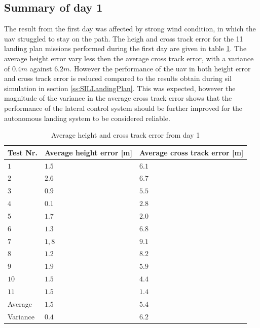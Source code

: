 \subsection{Summary of day 1}\label{sss:summaryDay1}
The result from the first day was affected by strong wind condition, in which the \gls{uav} struggled to stay on the path. The heigh and cross track error for the 11 landing plan missions performed during the first day are given in table \ref{tb:Day1HeightCrossTrack}. The average height error vary less then the average cross track error, with a variance of $0.4 m$ against $6.2 m$. However the performance of the \gls{uav} in both height error and cross track error is reduced compared to the results obtain during \gls{sil} simulation in section \ref{ss:SILLandingPlan}. This was expected, however the magnitude of the variance in the average cross track error shows that the performance of the lateral control system should be further improved for the autonomous landing system to be considered reliable.
\begin{table}[H]
\centering
\begin{tabular}{| l | l | l |}
\hline
\textbf{Test Nr.} 	& \textbf{Average height error [m]} 	& \textbf{Average cross track error [m]}  \\ \hline
$1$				& $1.5$							& $6.1$								\\ \hline
$2$				& $2.6$							& $6.7$								\\ \hline
$3$				& $0.9$							& $5.5$								\\ \hline
$4$				& $0.1$							& $2.8$								\\ \hline
$5$				& $1.7$							& $2.0$								\\ \hline
$6$				& $1.3$							& $6.8$								\\ \hline
$7$				& $1,8$							& $9.1$								\\ \hline
$8$				& $1.2$							& $8.2$								\\ \hline
$9$				& $1.9$							& $5.9$								\\ \hline
$10$			& $1.5$							& $4.4$								\\ \hline
$11$			& $1.5$							& $1.4$								\\ \hline \hline
Average			& $1.5$							& $5.4$								\\ \hline
Variance		& $0.4$							& $6.2$								\\ \hline
\end{tabular}
\caption{Average height and cross track error from day 1}
\label{tb:Day1HeightCrossTrack}
\end{table}
